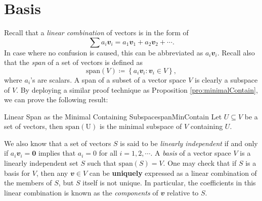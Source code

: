 \documentclass[math, code]{amznotes}
\theoremstyle{remark}
\newcommand{\zero}{\mathbf{0}}
\begin{document}
\section{Basis}
Recall that a \textit{linear combination} of vectors is in the form of
\begin{equation*}
    \sum a_i\mathbfit{v}_i = a_1\mathbfit{v}_1 + a_2\mathbfit{v}_2 + \cdots.
\end{equation*}
In case where no confusion is caused, this can be abbreviated as $a_i\mathbfit{v}_i$. Recall also that the \textit{span} of a set of vectors is defined as
\begin{equation*}
    \mathrm{span}(V) \coloneqq \left\{a_i\mathbfit{v}_i \colon \mathbfit{v}_i \in V\right\},
\end{equation*}
where $a_i$'s are scalars. A span of a subset of a vector space $V$ is clearly a subspace of $V$. By deploying a similar proof technique as Proposition \ref{pro:minimalContain}, we can prove the following result:
\begin{probox}{Linear Span as the Minimal Containing Subspace}{spanMinContain}
    Let $U \subseteq V$ be a set of vectors, then $\mathrm{span(U)}$ is the minimal subspace of $V$ containing $U$.
\end{probox}
We also know that a set of vectors $S$ is said to be \textit{linearly independent} if and only if  $a_i\mathbfit{v}_i = \zero$ implies that $a_i = 0$ for all $i = 1, 2, \cdots$. A \textit{basis} of a vector space $V$ is a linearly independent set $S$ such that $\mathrm{span}(S) = V$. One may check that if $S$ is a basis for $V$, then any $\mathbfit{v} \in V$ can be \textbf{uniquely} expressed as a linear combination of the members of $S$, but $S$ itself is not unique. In particular, the coefficients in this linear combination is known as the \textit{components} of $\mathbfit{v}$ relative to $S$.
\end{document}
